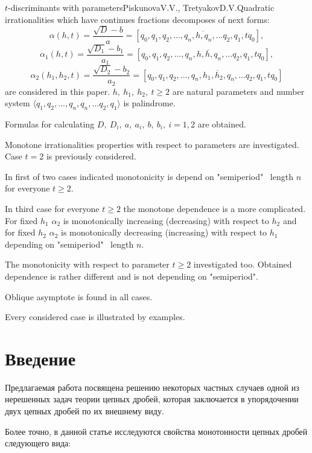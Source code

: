 \begin{abstractX}{$t$-discriminants with parameters}{Piskunova\;V.\;V., Tretyakov\;D.\;V.}Quadratic irrationalities which have continues fractions decomposes of next forms:
$$
\alpha(h,t)=\frac{\sqrt{D}-b}{a}=
[q_{0},\overline{q_{1},q_{2},...,q_{n},h,q_{n},...q_{2},q_{1},tq_{0}}],
$$
$$
\alpha_{1}(h,t)=\frac{\sqrt{D_{1}}-b_{1}}{a_{1}}=
[q_{0},\overline{q_{1},q_{2},...,q_{n},h,h,q_{n},...q_{2},q_{1},tq_{0}}],
$$
$$
\alpha_{2}(h_1,h_2,t)=\frac{\sqrt{D_{2}}-b_{2}}{a_{2}}=
[q_{0},\overline{q_{1},q_{2},...,q_{n},h_{1},h_{2},q_{n},...q_{2},q_{1},tq_{0}}]
$$
are considered in this paper. $h, \  h_{1}, \  h_{2}, \  t \geq 2$ are natural parameters and number system $\langle q_{1},q_{2},...,q_{n},q_{n},...q_{2},q_{1}\rangle$ is palindrome.

Formulas for calculating $D, \ D_{i}, \ a, \ a_{i},  \ b, \ b_{i}, \  i=1,2$ are obtained.

Monotone  irrationalities properties with respect to parameters are investigated. Case $t=2$ is previously considered.

In first of two cases indicated monotonicity is depend on "semiperiod"  \ length $n$ for everyone $t \geq 2$.

In third case for everyone $t \geq 2$ the monotone dependence is a more complicated. For fixed $h_{1}$ $\alpha_{2}$ is monotonically increasing (decreasing) with respect to $h_{2}$ and for fixed $h_{2}$ $\alpha_{2}$ is monotonically decreasing (increasing) with respect to $h_{1}$ depending on "semiperiod"  \ length $n$.

The monotonicity with respect to parameter $t \geq 2$ investigated too. Obtained dependence is rather different and is not depending on "semiperiod".

Oblique asymptote is found in all cases.

Every considered case is illustrated by examples.
\end{abstractX}

\section*{Введение}

Предлагаемая работа посвящена решению некоторых частных случаев одной из нерешенных задач теории цепных дробей, которая заключается в упорядочении двух цепных дробей по их внешнему виду.

Более точно, в данной статье исследуются свойства монотонности цепных дробей следующего вида:

